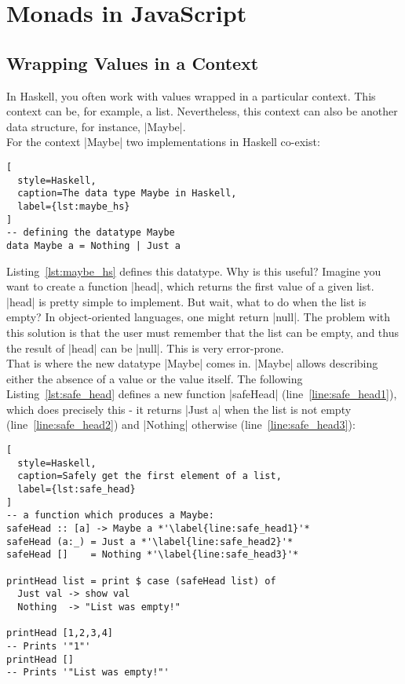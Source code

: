 \section{Monads in JavaScript} %
\label{sec:Monads in JavaScript}

\subsection{Wrapping Values in a Context} %
\label{sub:Wrapping values in a context}

In Haskell, you often work with values wrapped in a particular context. This
context can be, for example, a list. Nevertheless, this context can also be
another data structure, for instance, |Maybe|. \\
For the context |Maybe| two implementations in Haskell co-exist:

\begin{lstlisting}[
  style=Haskell,
  caption=The data type Maybe in Haskell,
  label={lst:maybe_hs}
]
-- defining the datatype Maybe
data Maybe a = Nothing | Just a
\end{lstlisting}

Listing~\ref{lst:maybe_hs} defines this datatype. Why is this useful?
Imagine you want to create a function |head|, which returns the first value of
a given list. |head| is pretty simple to implement. But wait, what to do when
the list is empty? In object-oriented languages, one might return |null|. The
problem with this solution is that the user must remember that the list can be
empty, and thus the result of |head| can be |null|. This is very error-prone.
\\

That is where the new datatype |Maybe| comes in. |Maybe| allows describing
either the absence of a value or the value itself. The following
Listing~\ref{lst:safe_head} defines a new function |safeHead|
(line~\ref{line:safe_head1}), which does
precisely this - it returns |Just a| when the list is not empty
(line~\ref{line:safe_head2}) and |Nothing| otherwise (line~\ref{line:safe_head3}):

\begin{lstlisting}[
  style=Haskell,
  caption=Safely get the first element of a list,
  label={lst:safe_head}
]
-- a function which produces a Maybe:
safeHead :: [a] -> Maybe a *'\label{line:safe_head1}'*
safeHead (a:_) = Just a *'\label{line:safe_head2}'*
safeHead []    = Nothing *'\label{line:safe_head3}'*

printHead list = print $ case (safeHead list) of 
  Just val -> show val
  Nothing  -> "List was empty!"

printHead [1,2,3,4]
-- Prints '"1"'
printHead []
-- Prints '"List was empty!"'
\end{lstlisting}

